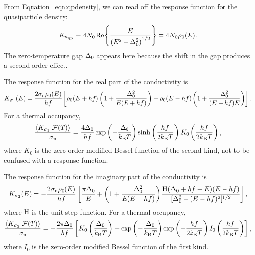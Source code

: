 From Equation~\ref{eqn:qpdensity}, we can read off the response function for the quasiparticle density:
\begin{equation}
K_{n_{\mathrm{qp}}}
  =
  4 N_0 \Re{\frac{E}{\left(E^2 - \Delta_0^2\right)^{1/2}}}
  \equiv
  4 N_0 \rho_0(E).
\end{equation}
The zero-temperature gap $\Delta_0$ appears here because the shift in the gap produces a second-order effect.

The response function for the real part of the conductivity is
\begin{equation}
K_{\sigma_1}(E)
  =
  \frac{2 \sigma_{\mathrm{n}} \rho_0(E)}{h f}
  \left[
  \rho_0(E + h f)
  \left(1 + \frac{\Delta_0^2}{E (E + h f)} \right)
  - \rho_0(E - h f)
  \left(1 + \frac{\Delta_0^2}{(E - h f) E} \right)
  \right].
\label{eqn:responseqpoccupancy_reconductivity}
\end{equation}
For a thermal occupancy,
\begin{equation}
\frac{\braket{K_{\sigma_1}}{\mathcal{F}(T)}}{\sigma_{\mathrm{n}}}
  =
  \frac{4 \Delta_0}{h f}
  \exp \left( -\frac{\Delta_0}{k_\mathrm{B} T} \right)
  \sinh \left( \frac{h f}{2 k_\mathrm{B} T} \right)
  K_0 \left( \frac{h f}{2 k_\mathrm{B} T} \right),
\label{eqn:responseqpoccupancy_reconductivity_thermal}
\end{equation}
where $K_0$ is the zero-order modified Bessel function of the second kind, not to be confused with a response function.

The response function for the imaginary part of the conductivity is
\begin{equation}
K_{\sigma_2}(E)
  =
  - \frac{2 \sigma_{\mathrm{n}} \rho_0(E)}{h f}
  \left[
  \frac{\pi \Delta_0}{E}
  +   \left( 1 + \frac{\Delta_0^2}{E (E - h f)} \right)
  \frac{\mathrm{H}(\Delta_0 + h f - E) (E - h f)}{[\Delta_0^2 - (E - h f)^2]^{1/2}}
  \right],
\label{eqn:responseqpoccupancy_imconductivity}
\end{equation}
where $\mathrm{H}$ is the unit step function.
For a thermal occupancy,
\begin{equation}
\frac{\braket{K_{\sigma_2}}{\mathcal{F}(T)}}{\sigma_{\mathrm{n}}}
  =
  -\frac{2 \pi \Delta_0}{h f}
  \left[
  K_0 \left( \frac{\Delta_0}{k_\mathrm{B} T} \right)
  + \exp \left( -\frac{\Delta_0}{k_\mathrm{B} T} \right)
  \exp \left( -\frac{h f}{2 k_\mathrm{B} T} \right)
  I_0 \left( \frac{h f}{2 k_\mathrm{B} T} \right)
  \right],
\label{eqn:responseqpoccupancy_imconductivity_thermal}
\end{equation}
where $I_0$ is the zero-order modified Bessel function of the first kind.

